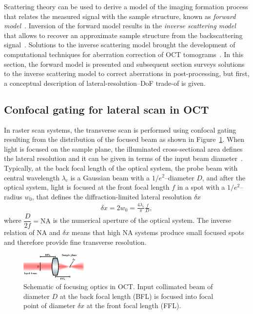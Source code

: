 Scattering theory can be used to derive a model of the imaging formation process that relates the measured signal with the sample structure, known as \textit{forward model}~\cite{Ralston2006_Inverse, Ralston2006_NonParaxial}. Inversion of the forward model results in the \textit{inverse scattering model} that allows to recover an approximate sample structure from the backscattering signal~\cite{Ralston2006_Interferometric}. Solutions to the inverse scattering model brought the development of computational techniques for aberration correction of OCT tomograms~\cite{Ralston2006_Interferometric, Yasuno2006_Noniterative, Adie2012_Computational}. In this section, the forward model is presented and subsequent section surveys solutions to the inverse scattering model to correct aberrations in post-processing, but first, a conceptual description of lateral-resolution--DoF trade-of is given.

\subsection{Confocal gating for lateral scan in OCT}

In raster scan systems, the transverse scan is performed using confocal gating resulting from the distribution of the focused beam as shown in Figure~\ref{fig:FocusingLens}. When light is focused on the sample plane, the illuminated cross-sectional area defines the lateral resolution and it can be given in terms of the input beam diameter~\cite{Yasuno2006_Noniterative}. Typically, at the back focal length of the optical system, the probe beam with central wavelength $\lambda_c$ is a Gaussian beam with a $1/e^2$--diameter $D$, and after the optical system, light is focused at the front focal length $f$ in a spot with a $1/e^2$--radius $w_0$, that defines the diffraction-limited lateral resolution $\delta x$~\cite{Fujimoto2015_Introduction}
\begin{align}
    \delta x = 2w_0 = \frac{4\lambda_c}{\pi} \frac{f}{D},
\end{align}
where $\dfrac{D}{2f} = \text{NA}$ is the numerical aperture of the optical system. The inverse relation of NA and $\delta x$ means that high NA systems produce small focused spots and therefore provide fine transverse resolution.

\begin{figure}[htb!]
    \centering
    \includegraphics[width=.6\textwidth]{Figures/TheoreticalBasis/FocusingLens.pdf}
    \caption[Schematic of focusing optics in OCT.]{Schematic of focusing optics in OCT. Input collimated beam of diameter $D$ at the back focal length (BFL) is focused into focal point of diameter $\delta x$ at the front focal length (FFL).}
    \label{fig:FocusingLens}
\end{figure}


